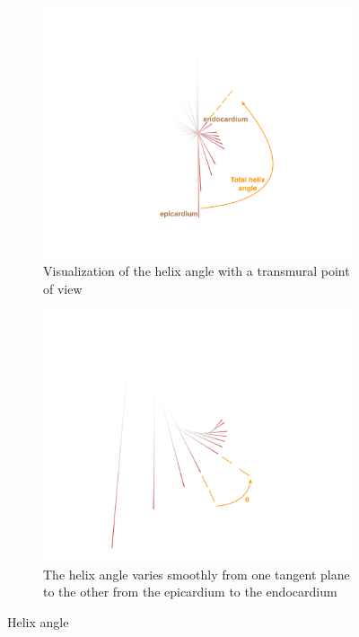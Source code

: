 \begin{figure}[!h]
    \centering
    \begin{subfigure}[t]{.48\textwidth}
        \includegraphics[width=\textwidth]{figures/total_angle}
        \caption[b]{Visualization of the helix angle with a transmural point of view}
        \label{fig:total_angle}
    \end{subfigure}
    \begin{subfigure}[t]{.48\textwidth}
        \includegraphics[width=\textwidth]{figures/helix_angle}
        \caption{The helix angle varies smoothly from one tangent plane to the other from the epicardium to the endocardium}
        \label{fig:helix_angle}
    \end{subfigure}
    \caption{Helix angle}
\end{figure}
